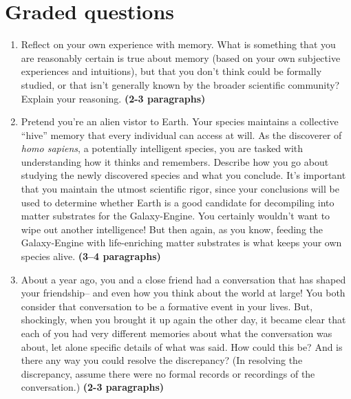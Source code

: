 \documentclass[11pt]{article}
\begin{document}
\section*{Graded questions}
\begin{enumerate}

\item Reflect on your own experience with memory.  What is something that you
are reasonably certain is true about memory (based on your own subjective
experiences and intuitions), but that you don't think could be formally
studied, or that isn't generally known by the broader scientific community?
Explain your reasoning. \textbf{(2-3 paragraphs)}

\item Pretend you're an alien vistor to Earth. Your species maintains a
collective ``hive'' memory that every individual can access at will. As the
discoverer of \textit{homo sapiens}, a potentially intelligent species, you are
tasked with understanding how it thinks and remembers. Describe how you go
about studying the newly discovered species and what you conclude. It's
important that you maintain the utmost scientific rigor, since your conclusions
will be used to determine whether Earth is a good candidate for decompiling
into matter substrates for the Galaxy-Engine. You certainly wouldn't want to
wipe out another intelligence! But then again, as you know, feeding the
Galaxy-Engine with life-enriching matter substrates is what keeps your own
species alive. \textbf{(3--4 paragraphs)}

\item About a year ago, you and a close friend had a conversation that has
shaped your friendship-- and even how you think about the world at large! You
both consider that conversation to be a formative event in your lives. But,
shockingly, when you brought it up again the other day, it became clear that
each of you had very different memories about what the conversation was about,
let alone specific details of what was said. How could this be? And is there
any way you could resolve the discrepancy? (In resolving the discrepancy,
assume there were no formal records or recordings of the conversation.)
\textbf{(2-3 paragraphs)} 

\end{enumerate}
\end{document}
